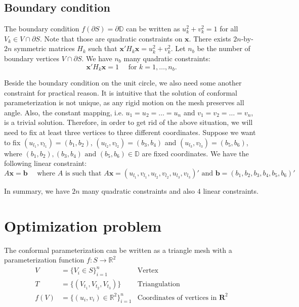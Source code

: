 \documentclass{article} %
\begin{document}
\subsection{Boundary condition}

The boundary condition $f(\partial S) = \partial \mathbb{D}$ can be written as $u_k^2 + v_k^2 = 1$ for all $V_k \in V \cap \partial S$. Note that those are quadratic constraints on $\mathbf{x}$. There exists $2n$-by-$2n$ symmetric matrices $H_k$ such that $\mathbf{x}' H_k \mathbf{x} = u_k^2 + v_k^2$. Let $n_b$ be the number of boundary vertices $V \cap \partial S$. We have $n_b$ many quadratic constraints:
$$
\mathbf{x}' H_k \mathbf{x} = 1 \quad \text{ for } k = 1, \dots, n_b.
$$

Beside the boundary condition on the unit circle, we also need some another constraint for practical reason. It is intuitive that the solution of conformal parameterization is not unique, as any rigid motion on the mesh preserves all angle. Also, the constant mapping, i.e. $u_1 = u_2 = \dots = u_n$ and $v_1 = v_2 = \dots = v_n$, is a trivial solution. Therefore, in order to get rid of the above situation, we will need to fix at least three vertices to three different coordinates. Suppose we want to fix $(u_{l_1}, v_{l_1}) = (b_1, b_2)$, $(u_{l_2}, v_{l_2}) = (b_3, b_4)$ and $(u_{l_3}, v_{l_3}) = (b_5, b_6)$, where $(b_1, b_2) , (b_3, b_4) \text{ and } (b_5, b_6) \in \mathbb{D}$ are fixed coordinates. We have the following linear constraint:
$$
A\mathbf{x} = \mathbf{b} \quad \text{ where } A \text{ is such that } A\mathbf{x} = (u_{l_1}, v_{l_1}, u_{l_2}, v_{l_2}, u_{l_3}, v_{l_3} )' \text{ and } \mathbf{b} = (b_1, b_2, b_3, b_4, b_5, b_6)'
$$

In summary, we have $2n$ many quadratic constraints and also $4$ linear constraints.

\section{Optimization problem}

The conformal parameterization can be written as a triangle mesh with a parameterization function $f: S \rightarrow \mathbb{R}^2$
\begin{align*}
V & = \{ V_i \in S\}_{i = 1}^{n} & \text{Vertex}\\
T & = \{ (V_{t_1}, V_{t_2}, V_{t_3}) \} & \text{Triangulation}\\
f(V) & = \{ (u_i, v_i) \in \mathbb{R}^2 \}_{i = 1}^{n} & \text{Coordinates of vertices in }\mathbf{R}^2
\end{align*}
\end{document}

